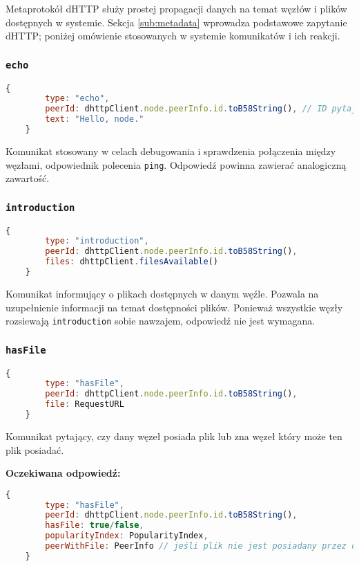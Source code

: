 Metaprotokół dHTTP służy prostej propagacji danych na temat węzłów i plików dostępnych w systemie. Sekcja \ref{sub:metadata} wprowadza podstawowe zapytanie dHTTP; poniżej omówienie stosowanych w systemie komunikatów i ich reakcji.

% 

\subsubsection{\texttt{echo}}
\begin{lstlisting}[language=javascript]
    {
        type: "echo",
        peerId: dhttpClient.node.peerInfo.id.toB58String(), // ID pytającego
        text: "Hello, node."
    }
\end{lstlisting}

Komunikat stosowany w celach debugowania i sprawdzenia połączenia między węzłami, odpowiednik polecenia \texttt{ping}. Odpowiedź powinna zawierać analogiczną zawartość.

% 

\subsubsection{\texttt{introduction}}
\begin{lstlisting}[language=javascript]
    {
        type: "introduction",
        peerId: dhttpClient.node.peerInfo.id.toB58String(),
        files: dhttpClient.filesAvailable()
    }
\end{lstlisting}

Komunikat informujący o plikach dostępnych w danym węźle. Pozwala na uzupełnienie informacji na temat dostępności plików. Ponieważ wszystkie węzły rozsiewają \texttt{introduction} sobie nawzajem, odpowiedź nie jest wymagana.

% 

\subsubsection{\texttt{hasFile}}
\begin{lstlisting}[language=javascript]
    {
        type: "hasFile",
        peerId: dhttpClient.node.peerInfo.id.toB58String(),
        file: RequestURL
    }
\end{lstlisting}

Komunikat pytający, czy dany węzeł posiada plik lub zna węzeł który może ten plik posiadać.

\pagebreak
\textbf{Oczekiwana odpowiedź:}
\begin{lstlisting}[language=javascript]
    {
        type: "hasFile",
        peerId: dhttpClient.node.peerInfo.id.toB58String(),
        hasFile: true/false,
        popularityIndex: PopularityIndex,
        peerWithFile: PeerInfo // jeśli plik nie jest posiadany przez dany węzeł, ale wie on o potencjalnym posiadaczu
    }
\end{lstlisting}

